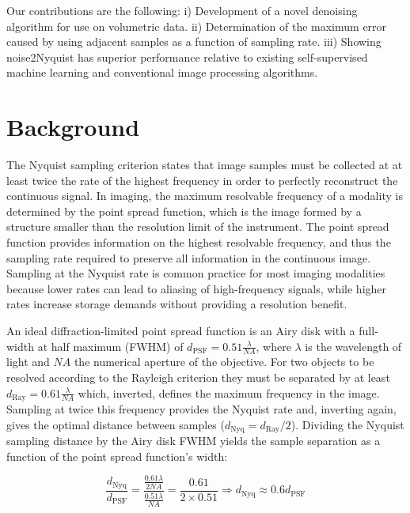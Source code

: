 \documentclass[12pt]{spieman}
\begin{document}
\begin{spacing}{2}
Our contributions are the following: i) Development of a novel denoising algorithm for use on volumetric data. ii) Determination of the maximum error caused by using adjacent samples as a function of sampling rate. iii) Showing noise2Nyquist has superior performance relative to existing self-supervised machine learning and conventional image processing algorithms.

\section{Background}
The Nyquist sampling criterion states that image samples must be collected at at least twice the rate of the highest frequency in order to perfectly reconstruct the continuous signal\cite{Shannon1949}. In imaging, the maximum resolvable frequency of a modality is determined by the point spread function, which is the image formed by a structure smaller than the resolution limit of the instrument\cite{goodman2005introduction}. The point spread function provides information on the highest resolvable frequency, and thus the sampling rate required to preserve all information in the continuous image. Sampling at the Nyquist rate is common practice for most imaging modalities because lower rates can lead to aliasing of high-frequency signals, while higher rates increase storage demands without providing a resolution benefit. 

An ideal diffraction-limited point spread function is an Airy disk with a full-width at half maximum (FWHM) of $d_{\mbox{PSF}}=0.51\frac{\lambda}{NA}$, where $\lambda$ is the wavelength of light and $NA$ the numerical aperture of the objective. For two objects to be resolved according to the Rayleigh criterion they must be separated by at least $d_{\mbox{Ray}}=0.61\frac{\lambda}{NA}$ which, inverted, defines the maximum frequency in the image. Sampling at twice this frequency provides the Nyquist rate and, inverting again, gives the optimal distance between samples ($d_{\mbox{Nyq}} = d_{\mbox{Ray}}/2$). Dividing the Nyquist sampling distance by the Airy disk FWHM yields the sample separation as a function of the point spread function's width:

\begin{equation}
    \frac{d_{\mbox{Nyq}}}{d_{\mbox{PSF}}} = \frac{\frac{0.61\lambda}{2NA}}{\frac{0.51\lambda}{NA}} = \frac{0.61}{2\times0.51} \Rightarrow d_{\mbox{Nyq}}\approx0.6 d_{\mbox{PSF}}
    \label{eq:Nyquist}
\end{equation}


\end{spacing}
\end{document}
